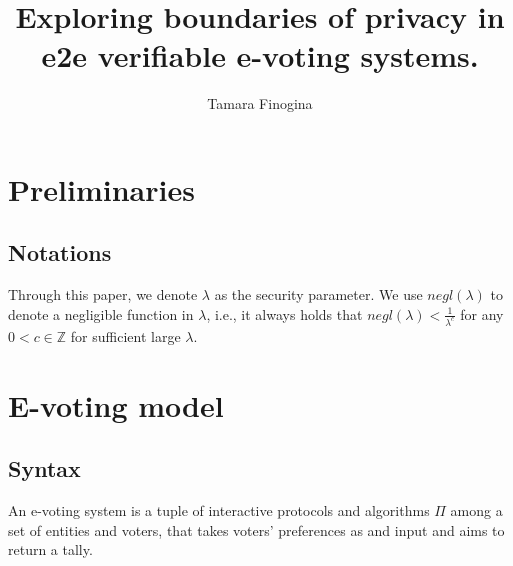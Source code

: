 \documentclass[12pt]{article}
\author{Tamara Finogina}
\title{Exploring boundaries of privacy in e2e verifiable e-voting systems.}
\date{}
\begin{document}
\maketitle
\section{Preliminaries} 
\subsection{Notations}
Through this paper, we denote $\lambda$ as the security parameter. We use $negl(\lambda)$ to denote a negligible function in $\lambda$, i.e., it always holds that $negl(\lambda) < \frac{1}{\lambda^c}$ for any $0<c \in \mathbb{Z}$ for sufficient large $\lambda$. 
\section{E-voting model}
\subsection{Syntax} 
An e-voting system is a tuple of interactive protocols and algorithms $\Pi$ among a set of entities and voters, that takes  voters' preferences as and input and aims to return a tally. \\
\end{document}
